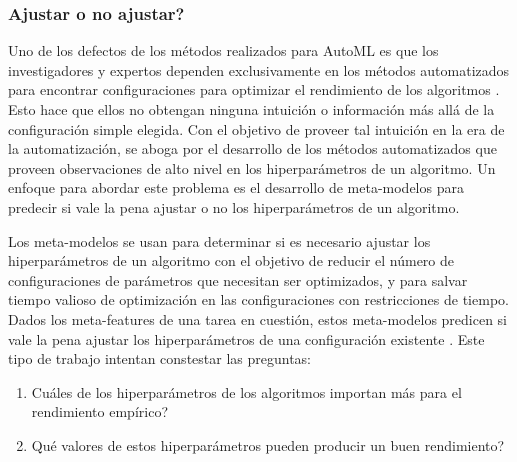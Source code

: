 \subsubsection{Ajustar o no ajustar?}


Uno de los defectos de los métodos realizados para AutoML es que los investigadores y expertos dependen exclusivamente en los métodos automatizados para encontrar configuraciones para optimizar el rendimiento de los algoritmos \cite{rijn2018hyp}. Esto hace que ellos no obtengan ninguna intuición o información más allá de la configuración simple elegida. Con el objetivo de proveer tal intuición en la era de la automatización, se aboga por el desarrollo de los métodos automatizados que proveen observaciones de alto nivel en los hiperparámetros de un algoritmo. Un enfoque para abordar este problema es el desarrollo de meta-modelos para predecir si vale la pena ajustar o no los hiperparámetros de un algoritmo.

Los meta-modelos se usan para determinar si es necesario ajustar los hiperparámetros de un algoritmo con el objetivo de reducir el número de configuraciones de parámetros que necesitan ser optimizados, y para salvar tiempo valioso de optimización en las configuraciones con restricciones de tiempo. Dados los meta-features de una tarea en cuestión, estos meta-modelos predicen si vale la pena ajustar los hiperparámetros de una configuración existente \cite{ridd2014using, rijn2018hyp}. Este tipo de trabajo intentan constestar las preguntas: 
\begin{enumerate}
	\item \textquestiondown Cuáles de los hiperparámetros de los algoritmos importan más para el rendimiento empírico?
	\item \textquestiondown Qué valores de estos hiperparámetros pueden producir un buen rendimiento?
\end{enumerate}

